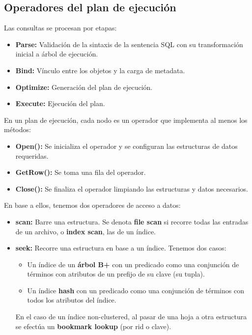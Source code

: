 \subsection*{Operadores del plan de ejecución}
Las consultas se procesan por etapas:
\begin{itemize}
    \item \textbf{Parse:} Validación de la sintaxis de la sentencia SQL con su transformación inicial a árbol de ejecución.
    \item \textbf{Bind:} Vínculo entre los objetos y la carga de metadata.
    \item \textbf{Optimize:} Generación del plan de ejecución.
    \item \textbf{Execute:} Ejecución del plan.
\end{itemize}
En un plan de ejecución, cada nodo es un operador que implementa al menos los métodos:
\begin{itemize}
    \item \textbf{Open():} Se inicializa el operador y se configuran las estructuras de datos requeridas.
    \item \textbf{GetRow():} Se toma una fila del operador.
    \item \textbf{Close():} Se finaliza el operador limpiando las estructuras y datos necesarios.
\end{itemize}
En base a ellos, tenemos dos operadores de acceso a datos:
\begin{itemize}
    \item \textbf{scan:} Barre una estructura. Se denota \textbf{file scan} si recorre todas las entradas de un archivo, o \textbf{index scan}, las de un índice.
    \item \textbf{seek:} Recorre una estructura en base a un índice. Tenemos dos casos:
    \begin{itemize}
        \item Un índice de un \textbf{árbol B+} con un predicado como una conjunción de términos con atributos de un prefijo de su clave (su tupla).
        \item Un índice \textbf{hash} con un predicado como una conjunción de términos con todos los atributos del índice.
    \end{itemize}
    En el caso de un índice non-clustered, al pasar de una hoja a otra estructura se efectúa un \textbf{bookmark lookup} (por rid o clave).
\end{itemize}

